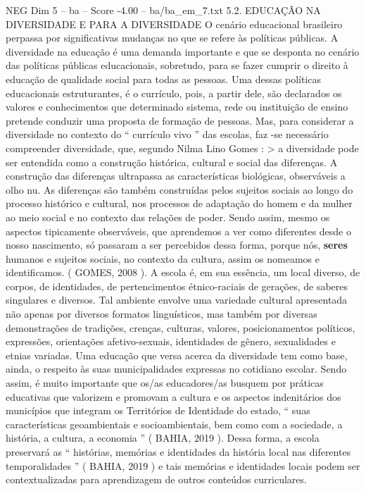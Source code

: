 \begin{textsample}{NEG Dim 5 – ba – Score -4.00 – ba/ba\_em\_7.txt}  \label{ex:f5_neg_002}
5.2.
EDUCAÇÃO NA DIVERSIDADE E PARA A DIVERSIDADE O cenário educacional brasileiro perpassa por significativas mudanças no que se refere às políticas públicas.
A diversidade na educação é uma demanda importante e que se desponta no cenário das políticas públicas educacionais, sobretudo, para se fazer cumprir o direito à educação de qualidade social para todas as pessoas.
Uma dessas políticas educacionais estruturantes, é o currículo, pois, a partir dele, são declarados os valores e conhecimentos que determinado sistema, rede ou instituição de ensino pretende conduzir uma proposta de formação de pessoas.
Mas, para considerar a diversidade no contexto do “ currículo vivo ” das escolas, faz -se necessário compreender diversidade, que, segundo Nilma Lino Gomes : > a diversidade pode ser entendida como a construção histórica, cultural e social das diferenças.
A construção das diferenças ultrapassa as características biológicas, observáveis a olho nu.
As diferenças são também construídas pelos sujeitos sociais ao longo do processo histórico e cultural, nos processos de adaptação do homem e da mulher ao meio social e no contexto das relações de poder.
Sendo assim, mesmo os aspectos tipicamente observáveis, que aprendemos a ver como diferentes desde o nosso nascimento, só passaram a ser percebidos dessa forma, porque nós, \textbf{seres} humanos e sujeitos sociais, no contexto da cultura, assim os nomeamos e identificamos. ( GOMES, 2008 ).
A escola é, em sua essência, um local diverso, de corpos, de identidades, de pertencimentos étnico-raciais de gerações, de saberes singulares e diversos.
Tal ambiente envolve uma variedade cultural apresentada não apenas por diversos formatos linguísticos, mas também por diversas demonstrações de tradições, crenças, culturas, valores, posicionamentos políticos, expressões, orientações afetivo-sexuais, identidades de gênero, sexualidades e etnias variadas.
Uma educação que versa acerca da diversidade tem como base, ainda, o respeito às suas municipalidades expressas no cotidiano escolar.
Sendo assim, é muito importante que os/as educadores/as busquem por práticas educativas que valorizem e promovam a cultura e os aspectos indenitários dos municípios que integram os Territórios de Identidade do estado, “ suas características geoambientais e socioambientais, bem como com a sociedade, a história, a cultura, a economia ” ( BAHIA, 2019 ).
Dessa forma, a escola preservará as “ histórias, memórias e identidades da história local nas diferentes temporalidades ” ( BAHIA, 2019 ) e tais memórias e identidades locais podem ser contextualizadas para aprendizagem de outros conteúdos curriculares.

\end{textsample}
